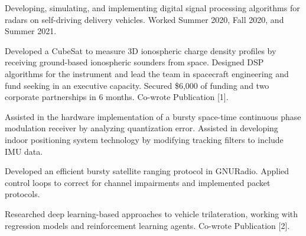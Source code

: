 \documentclass[10pt,a4paper,ragged2e,withhyper]{altacv}
\begin{document}
\begin{paracol}{2}



Developing, simulating, and implementing digital signal processing algorithms for radars on self-driving delivery vehicles. Worked Summer 2020, Fall 2020, and Summer 2021.

\divider

Developed a CubeSat to measure 3D ionospheric charge density profiles by receiving ground-based ionospheric sounders from space. Designed DSP algorithms for the instrument and lead the team in spacecraft engineering and fund seeking in an executive capacity. Secured \$6,000 of funding and two corporate partnerships in 6 months. Co-wrote Publication [1].

\divider

Assisted in the hardware implementation of a bursty space-time continuous phase modulation receiver by analyzing quantization error. Assisted in developing indoor positioning system technology by modifying tracking filters to include IMU data.

\divider

Developed an efficient bursty satellite ranging protocol in GNURadio. Applied control loops to correct for channel impairments and implemented packet protocols.

\divider

Researched deep learning-based approaches to vehicle trilateration, working with regression models and reinforcement learning agents. Co-wrote Publication [2].


\end{paracol}
\end{document}
